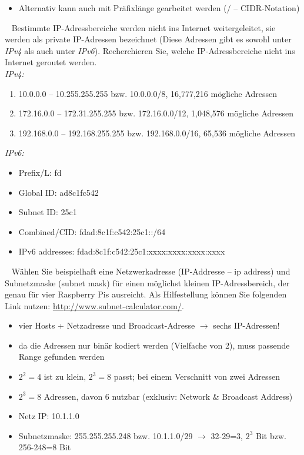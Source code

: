 \documentclass[paper=a4,fontsize=11pt]{scrartcl}%
\numberwithin{equation}{section}
\begin{document}
\begin{itemize}
\begin{tasks}
\begin{itemize}
		\item Alternativ kann auch mit Präfixlänge gearbeitet werden (/ -- CIDR-Notation)
	\end{itemize}
	\task~ Bestimmte IP-Adressbereiche werden nicht ins Internet weitergeleitet, sie werden als private IP-Adressen bezeichnet (Diese Adressen gibt es sowohl unter \emph{IPv4} als auch unter \emph{IPv6}). Recherchieren Sie, welche IP-Adressbereiche nicht ins Internet geroutet werden.\\
	\emph{IPv4:}
	\begin{enumerate}
		\item 10.0.0.0 -- 10.255.255.255 bzw. 10.0.0.0/8, 16,777,216 mögliche Adressen
		\item 172.16.0.0 -- 172.31.255.255 bzw. 172.16.0.0/12, 1,048,576 mögliche Adressen
		\item 192.168.0.0 -- 192.168.255.255 bzw. 192.168.0.0/16, 65,536 mögliche Adressen
	\end{enumerate}
	\emph{IPv6:}
	\begin{itemize}
		\item Prefix/L:	  fd
		\item Global ID:	  ad8c1fc542
		\item Subnet ID:	  25c1
		\item Combined/CID:	  fdad:8c1f:c542:25c1::/64
		\item IPv6 addresses:	  fdad:8c1f:c542:25c1:xxxx:xxxx:xxxx:xxxx
	\end{itemize}
	\task~ Wählen Sie beispielhaft eine Netzwerkadresse (IP-Addresse -- ip address) und Subnetzmaske (subnet mask) für einen möglichst kleinen IP-Adressbereich, der genau für vier Raspberry Pis ausreicht. Als Hilfestellung können Sie folgenden Link nutzen: \url{http://www.subnet-calculator.com/}.
	\begin{itemize}
		\item vier Hosts + Netzadresse und Broadcast-Adresse $\rightarrow$ sechs IP-Adressen!
		\item da die Adressen nur binär kodiert werden (Vielfache von 2), muss passende Range gefunden werden
		\item $2^2 = 4$ ist zu klein, $2^3 = 8$ passt; bei einem Verschnitt von zwei Adressen
		\item $2^3 = 8$ Adressen, davon 6 nutzbar (exklusiv: Network \& Broadcast Address)
		\item Netz IP: 10.1.1.0
		\item Subnetzmaske: 255.255.255.248 bzw. 10.1.1.0/29 $\rightarrow$ 32-29=3, $2^3$ Bit bzw. 256-248=8 Bit
\end{itemize}		
\end{tasks}
\end{itemize}
\end{document}
